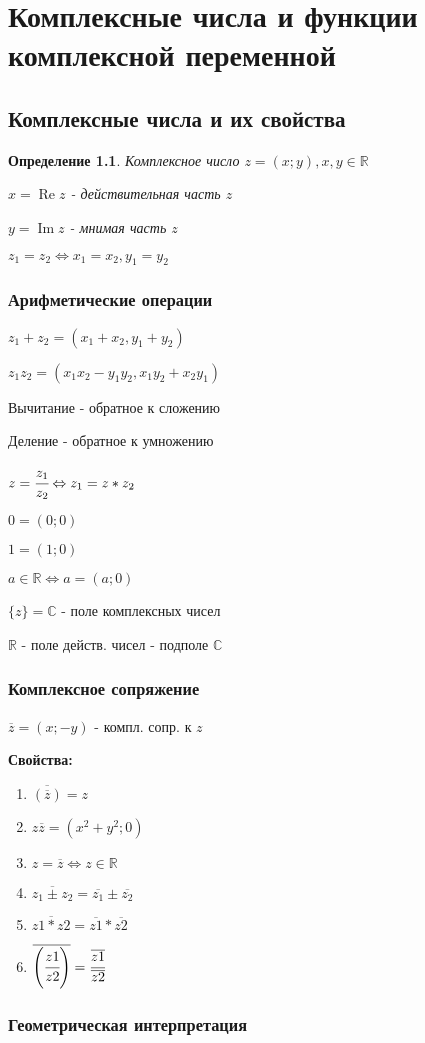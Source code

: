 \documentclass[draft]{report}
\newcommand{\R}{\mathbb{R}}
\renewcommand{\C}{\mathbb{C}}
\newcommand{\LRA}{\Leftrightarrow}
\renewcommand{\bar}{\overline}
\renewcommand{\Im}{\mathop{\mathrm{Im}}\nolimits}
\renewcommand{\Re}{\mathop{\mathrm{Re}}\nolimits}
\newcommand{\opr}[1]{\begin{opred}#1\end{opred}}
\newtheorem*{opred}{Определение}
\theoremstyle{remark}
\begin{document}
\tableofcontents
\chapter{Комплексные числа и функции комплексной переменной}
\section{Комплексные числа и их свойства}
\opr{Комплексное число $z=(x;y), x,y\in\R$

$x=\Re z$ - действительная часть $z$

$y=\Im z$ - мнимая часть $z$}

$z_1=z_2 \LRA x_1=x_2, y_1=y_2$
\subsection{Арифметические операции}
$z_1+z_2=(x_1+x_2,y_1+y_2)$

$z_1z_2=(x_1x_2-y_1y_2,x_1y_2+x_2y_1)$

Вычитание - обратное к сложению

Деление - обратное к умножению

$z=\cfrac{z_1}{z_2} \LRA z_1=z*z_2$

$0=(0;0)$

$1=(1;0)$

$a\in\R\LRA a=(a;0)$

$\{z\}=\C$ - поле комплексных чисел

$\R$ - поле действ. чисел - подполе $\C$
\subsection{Комплексное сопряжение}

$\bar{z}=(x;-y)$ - компл. сопр. к $z$

{\bfseries Свойства:}
\begin{enumerate}
\item$\bar{\left(\bar{z}\right)}=z$
\item$z\bar{z}=(x^2+y^2;0)$
\item$z=\bar{z}\LRA z\in\R$
\item$\bar{z_1\pm z_2}=\bar{z_1}\pm\bar{z_2}$
\item$\bar{z1*z2}=\bar{z1}*\bar{z2}$
\item$\bar{\left(\cfrac{z1}{z2}\right)}=\cfrac{\bar{z1}}{\bar{z2}}$
\end{enumerate}
\subsection{Геометрическая интерпретация}
\end{document}
